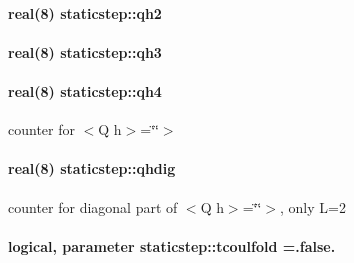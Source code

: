 \paragraph[{\texorpdfstring{qh2}{qh2}}]{\setlength{\rightskip}{0pt plus 5cm}real(8) staticstep\+::qh2\hspace{0.3cm}{\ttfamily [private]}}\hypertarget{namespacestaticstep_a897519f2def07749c367f0380bdc452a}{}\label{namespacestaticstep_a897519f2def07749c367f0380bdc452a}
\paragraph[{\texorpdfstring{qh3}{qh3}}]{\setlength{\rightskip}{0pt plus 5cm}real(8) staticstep\+::qh3\hspace{0.3cm}{\ttfamily [private]}}\hypertarget{namespacestaticstep_ade5f5f5eb8e4fe1c8c95cbbfe3eab7fb}{}\label{namespacestaticstep_ade5f5f5eb8e4fe1c8c95cbbfe3eab7fb}
\paragraph[{\texorpdfstring{qh4}{qh4}}]{\setlength{\rightskip}{0pt plus 5cm}real(8) staticstep\+::qh4\hspace{0.3cm}{\ttfamily [private]}}\hypertarget{namespacestaticstep_a565f7e97adec7cf001d80bcbeb5294b9}{}\label{namespacestaticstep_a565f7e97adec7cf001d80bcbeb5294b9}


counter for $<$\+Q h$>$=\char`\"{}\char`\"{}$>$ 

\paragraph[{\texorpdfstring{qhdig}{qhdig}}]{\setlength{\rightskip}{0pt plus 5cm}real(8) staticstep\+::qhdig\hspace{0.3cm}{\ttfamily [private]}}\hypertarget{namespacestaticstep_a03eb2b19fb183c4ec6075241077232ca}{}\label{namespacestaticstep_a03eb2b19fb183c4ec6075241077232ca}


counter for diagonal part of $<$\+Q h$>$=\char`\"{}\char`\"{}$>$, only L=2 

\paragraph[{\texorpdfstring{tcoulfold}{tcoulfold}}]{\setlength{\rightskip}{0pt plus 5cm}logical, parameter staticstep\+::tcoulfold =.false.\hspace{0.3cm}{\ttfamily [private]}}\hypertarget{namespacestaticstep_adffa15eea060b1ffa80c6aaf1aac37ee}{}\label{namespacestaticstep_adffa15eea060b1ffa80c6aaf1aac37ee}


